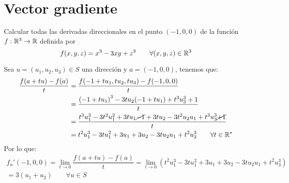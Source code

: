 \section{Vector gradiente}

\begin{ejercicio}
    Calcular todas las derivadas direccionales en el punto $(-1,0,0)$ de la función $f:\mathbb{R}^3\to \mathbb{R}$ definida por
    \begin{equation*}
        f(x,y,z) = x^3  -3xy + z^3 \qquad \forall (x,y,z)\in \mathbb{R}^3
    \end{equation*}

    \noindent
    Sea $u=(u_1,u_2,u_3)\in S$ una dirección y $a = (-1,0,0)$, tenemos que:
    \begin{align*}
        \dfrac{f(a+tu)-f(a)}{t} &= \dfrac{f(-1+tu_1, tu_2, tu_3) - f(-1,0,0)}{t} \\ &= \dfrac{{(-1+tu_1)}^{3}-3tu_2(-1+tu_1) + t^3u_3^3 + 1}{t} \\
                                &= \dfrac{t^3u_1^3 - 3t^2u_1^2 + 3tu_1 \cancel{- 1} + 3tu_2 - 3t^2u_2u_1 + t^3u_3^3 \cancel{+ 1}}{t} \\
                                &= t^2u_1^3 - 3tu_1^2 + 3u_1 + 3u_2 - 3tu_2u_1 + t^2u_3^3 \qquad \forall t\in \mathbb{R}^\ast
    \end{align*}
    Por lo que:
    \begin{multline*}
        f_u'(-1,0,0) = \lim_{t\to0}\dfrac{f(a+tu)-f(a)}{t} = \lim_{t\to0}\left(t^2u_1^3 - 3tu_1^2 + 3u_1 + 3u_2 - 3tu_2u_1 + t^2u_3^3\right) \\ = 3(u_1 + u_2) \qquad \forall u\in S
    \end{multline*}
\end{ejercicio}

